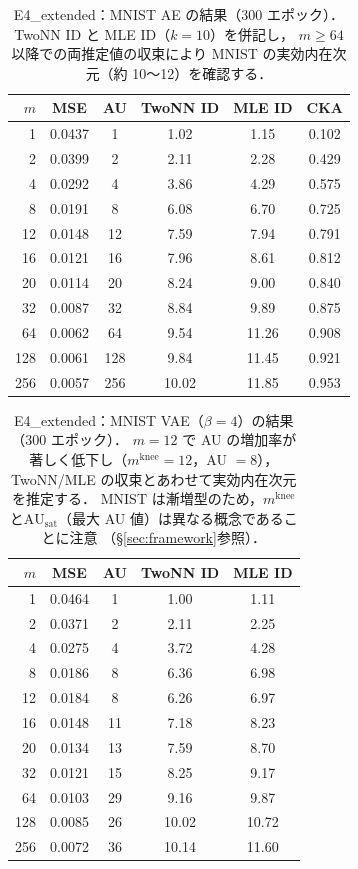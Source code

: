 \documentclass[12pt,a4paper]{jsarticle}
\newcommand{\AUsat}{\mathrm{AU}_{\mathrm{sat}}}
\newcommand{\mknee}{m^{\mathrm{knee}}}      %
\begin{document}
\begin{table}[H]
\centering
\caption{E4\_extended：MNIST AE の結果（300 エポック）．TwoNN ID と MLE ID（$k=10$）を併記し，
$m \geq 64$ 以降での両推定値の収束により MNIST の実効内在次元（約 10〜12）を確認する．}
\label{tab:e4_ae}
\begin{tabular}{rccccc}
\toprule
$m$ & MSE & AU & TwoNN ID & MLE ID & CKA \\
\midrule
1   & 0.0437 & 1   & 1.02  & 1.15  & 0.102 \\
2   & 0.0399 & 2   & 2.11  & 2.28  & 0.429 \\
4   & 0.0292 & 4   & 3.86  & 4.29  & 0.575 \\
8   & 0.0191 & 8   & 6.08  & 6.70  & 0.725 \\
12  & 0.0148 & 12  & 7.59  & 7.94  & 0.791 \\
16  & 0.0121 & 16  & 7.96  & 8.61  & 0.812 \\
20  & 0.0114 & 20  & 8.24  & 9.00  & 0.840 \\
32  & 0.0087 & 32  & 8.84  & 9.89  & 0.875 \\
64  & 0.0062 & 64  & 9.54  & 11.26 & 0.908 \\
128 & 0.0061 & 128 & 9.84  & 11.45 & 0.921 \\
256 & 0.0057 & 256 & 10.02 & 11.85 & 0.953 \\
\bottomrule
\end{tabular}
\end{table}

\begin{table}[H]
\centering
\caption{E4\_extended：MNIST VAE（$\beta = 4$）の結果（300 エポック）．
$m = 12$ で AU の増加率が著しく低下し（$\mknee = 12$，AU $= 8$），
TwoNN/MLE の収束とあわせて実効内在次元を推定する．
MNIST は漸増型のため，$\mknee$と$\AUsat$（最大 AU 値）は異なる概念であることに注意
（§\ref{sec:framework}参照）．}
\label{tab:e4_vae}
\begin{tabular}{rcccc}
\toprule
$m$ & MSE & AU & TwoNN ID & MLE ID \\
\midrule
1   & 0.0464 & 1  & 1.00 & 1.11 \\
2   & 0.0371 & 2  & 2.11 & 2.25 \\
4   & 0.0275 & 4  & 3.72 & 4.28 \\
8   & 0.0186 & 8  & 6.36 & 6.98 \\
12  & 0.0184 & 8  & 6.26 & 6.97 \\
16  & 0.0148 & 11 & 7.18 & 8.23 \\
20  & 0.0134 & 13 & 7.59 & 8.70 \\
32  & 0.0121 & 15 & 8.25 & 9.17 \\
64  & 0.0103 & 29 & 9.16 & 9.87 \\
128 & 0.0085 & 26 & 10.02 & 10.72 \\
256 & 0.0072 & 36 & 10.14 & 11.60 \\
\bottomrule
\end{tabular}
\end{table}
\end{document}
